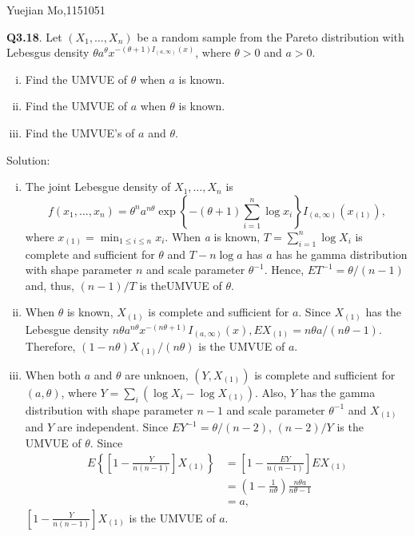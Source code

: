 \documentclass{article}
\newcommand{\tmtextbf}[1]{{\bfseries{#1}}}
\newcommand{\tmtextit}[1]{{\itshape{#1}}}
\newenvironment{enumerateroman}{\begin{enumerate}[i.] }{\end{enumerate}}
\begin{document}
Yuejian Mo,1151051

\tmtextbf{Q3.18}. Let $(X_1, \ldots, X_n)$ be a random sample from the Pareto
distribution with Lebesgus density $\theta a^{\theta} x^{- (\theta + 1) I_{(a,
\infty)} (x)}$, where $\theta > 0$ and $a > 0$.
\begin{enumerateroman}
  \item Find the UMVUE of $\theta$ when $a$ is known.
  
  \item Find the UMVUE of $a$ when $\theta$ is known.
  
  \item Find the UMVUE's of $a$ and $\theta$.
\end{enumerateroman}
Solution:
\begin{enumerateroman}
  \item The joint Lebesgue density of $X_1, \ldots, X_n$ is
  \[ f (x_1, \ldots, x_n) = \theta^n a^{n \theta} \exp \left\{ - (\theta + 1)
     \sum_{i = 1}^n \log x_i \right\} I_{(a, \infty)} (x_{(1)}), \]
  where $x_{(1)} = \min_{1 \leqslant i \leqslant n} x_i$. When \tmtextit{a} is
  known, $T = \sum_{i = 1}^n \log X_i$ is complete and sufficient for $\theta$
  and $T - n \log a$ has $a$ has he gamma distribution with shape parameter
  $n$ and scale parameter $\theta^{- 1}$. Hence, $E T^{- 1} = \theta / (n -
  1)$ and, thus, $(n - 1) / T$ is theUMVUE of $\theta$.
  
  \item When $\theta$ is known, $X_{(1)}$ is complete and sufficient for $a.$
  Since $X_{(1)}$ has the Lebesgue density $n \theta a^{n \theta} x^{- (n
  \theta + 1)} I_{(a, \infty)} (x), E X_{(1)} = n \theta a / (n \theta - 1) .$
  Therefore, $(1 - n \theta) X_{(1)} / (n \theta)$ is the UMVUE of $a$.
  
  \item When both $a$ and $\theta$ are unknoen, $(Y, X_{(1)})$ is complete and
  sufficient for $(a, \theta)$, where $Y = \sum_i (\log X_i - \log X_{(1)})$.
  Also, $Y$ has the gamma distribution with shape parameter $n - 1$ and scale
  parameter $\theta^{- 1}$ and $X_{(1)}$ and $Y$ are independent. Since $E
  Y^{- 1} = \theta / (n - 2)$, $(n - 2) / Y$ is the UMVUE of $\theta$. Since
  \[ \  \]
  \[ \begin{array}{ll}
       E \left\{ \left[ 1 - \frac{Y}{n (n - 1)} \right] X_{(1)} \right\} & =
       \left[ 1 - \frac{E Y}{n (n - 1)} \right] E X_{(1)}\\
       & = \left( 1 - \frac{1}{n \theta} \right) \frac{n \theta a}{n \theta -
       1}\\
       & = a,
     \end{array} \]
  $\left[ 1 - \frac{Y}{n (n - 1)} \right] X_{(1)}$ is the UMVUE of $a$.
\end{enumerateroman}
\end{document}
